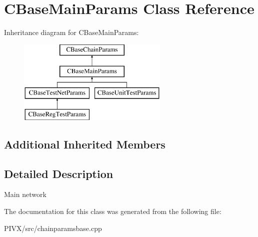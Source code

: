 \hypertarget{class_c_base_main_params}{}\section{C\+Base\+Main\+Params Class Reference}
\label{class_c_base_main_params}
Inheritance diagram for C\+Base\+Main\+Params\+:\begin{figure}[H]
\begin{center}
\leavevmode
\includegraphics[height=4.000000cm]{class_c_base_main_params}
\end{center}
\end{figure}
\subsection*{Additional Inherited Members}


\subsection{Detailed Description}
Main network 

The documentation for this class was generated from the following file\+:\begin{DoxyCompactItemize}
\item 
P\+I\+V\+X/src/chainparamsbase.\+cpp\end{DoxyCompactItemize}
